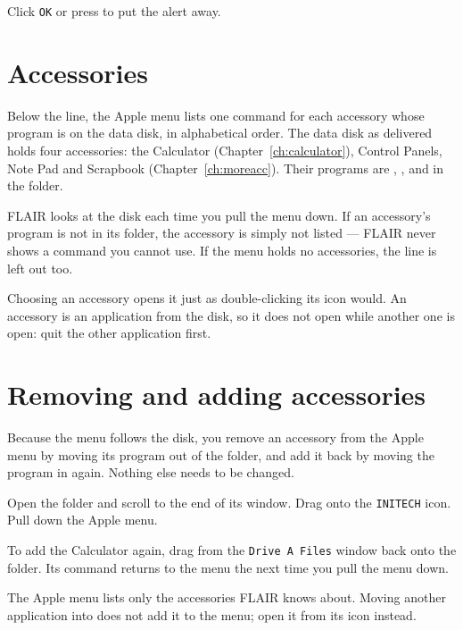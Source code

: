 Click \texttt{OK} or press  to put the alert away.

\section{Accessories}
Below the line, the Apple menu lists one command for each accessory whose
program is on the data disk, in alphabetical order.  The data disk as
delivered holds four accessories: the Calculator (Chapter~\ref{ch:calculator}),
Control Panels, Note Pad and Scrapbook (Chapter~\ref{ch:moreacc}).  Their programs are
, ,  and 
in the  folder.

FLAIR looks at the disk each time you pull the menu down.  If an
accessory's program is not in its folder, the accessory is simply not
listed --- FLAIR never shows a command you cannot use.  If the menu holds
no accessories, the line is left out too.

Choosing an accessory opens it just as double-clicking its icon would.  An
accessory is an application from the disk, so it does not open while
another one is open: quit the other application first.

\section{Removing and adding accessories}
Because the menu follows the disk, you remove an accessory from the Apple
menu by moving its program out of the  folder, and add it back
by moving the program in again.  Nothing else needs to be changed.
\begin{TaskSteps}
\Step Open the  folder and scroll to the end of its window.
\Step Drag  onto the \texttt{INITECH} icon.
\Step Pull down the Apple menu.
\end{TaskSteps}


To add the Calculator again, drag  from the
\texttt{Drive A Files} window back onto the  folder.  Its
command returns to the menu the next time you pull the menu down.

The Apple menu lists only the accessories FLAIR knows about.  Moving
another application into  does not add it to the menu; open it
from its icon instead.
